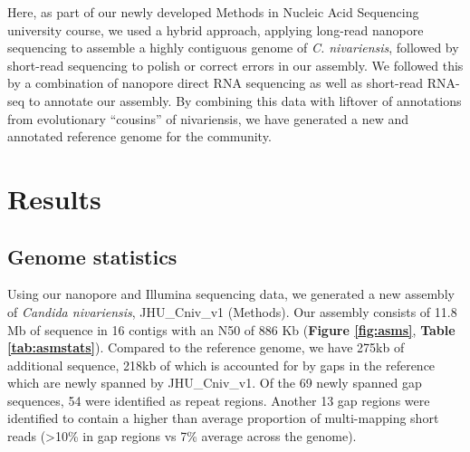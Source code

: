 Here, as part of our newly developed Methods in Nucleic Acid Sequencing university course, we used a hybrid approach, applying long-read nanopore sequencing to assemble a highly contiguous genome of \textit{C. nivariensis}, followed by short-read sequencing to polish or correct errors in our assembly. We followed this by a combination of nanopore direct RNA sequencing as well as short-read RNA-seq to annotate our assembly. By combining this data with liftover of annotations from evolutionary “cousins” of nivariensis, we have generated a new and annotated reference genome for the community.


\section{Results}
\label{sec:results}

\subsection{Genome statistics}
\label{sec:genstat}


Using our nanopore and Illumina sequencing data, we generated a new assembly of \textit{Candida nivariensis}, JHU\_Cniv\_v1 (Methods).  Our assembly consists of 11.8 Mb of sequence in 16 contigs with an N50 of 886 Kb ({\bf Figure \ref{fig:asms}}, {\bf Table \ref{tab:asmstats}}). Compared to the reference genome, we have 275kb of additional sequence, 218kb of which is accounted for by gaps in the reference which are newly spanned by JHU\_Cniv\_v1. Of the 69 newly spanned gap sequences, 54 were identified as repeat regions. Another 13 gap regions were identified to contain a higher than average proportion of multi-mapping short reads (>10\% in gap regions vs 7\% average across the genome).



